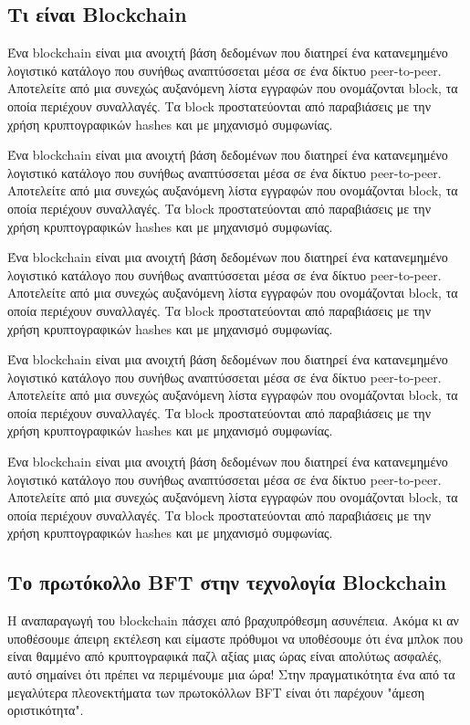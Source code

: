 \subsection{Τι είναι Blockchain}
Ένα blockchain είναι μια ανοιχτή βάση δεδομένων που διατηρεί ένα κατανεμημένο λογιστικό κατάλογο που συνήθως αναπτύσσεται μέσα σε ένα δίκτυο peer-to-peer. Αποτελείτε από μια συνεχώς αυξανόμενη λίστα εγγραφών που ονομάζονται block, τα οποία περιέχουν συναλλαγές. Τα block προστατεύονται από παραβιάσεις με την χρήση κρυπτογραφικών hashes και με μηχανισμό συμφωνίας.

Ένα blockchain είναι μια ανοιχτή βάση δεδομένων που διατηρεί ένα κατανεμημένο λογιστικό κατάλογο που συνήθως αναπτύσσεται μέσα σε ένα δίκτυο peer-to-peer. Αποτελείτε από μια συνεχώς αυξανόμενη λίστα εγγραφών που ονομάζονται block, τα οποία περιέχουν συναλλαγές. Τα block προστατεύονται από παραβιάσεις με την χρήση κρυπτογραφικών hashes και με μηχανισμό συμφωνίας.

Ένα blockchain είναι μια ανοιχτή βάση δεδομένων που διατηρεί ένα κατανεμημένο λογιστικό κατάλογο που συνήθως αναπτύσσεται μέσα σε ένα δίκτυο peer-to-peer. Αποτελείτε από μια συνεχώς αυξανόμενη λίστα εγγραφών που ονομάζονται block, τα οποία περιέχουν συναλλαγές. Τα block προστατεύονται από παραβιάσεις με την χρήση κρυπτογραφικών hashes και με μηχανισμό συμφωνίας.

Ένα blockchain είναι μια ανοιχτή βάση δεδομένων που διατηρεί ένα κατανεμημένο λογιστικό κατάλογο που συνήθως αναπτύσσεται μέσα σε ένα δίκτυο peer-to-peer. Αποτελείτε από μια συνεχώς αυξανόμενη λίστα εγγραφών που ονομάζονται block, τα οποία περιέχουν συναλλαγές. Τα block προστατεύονται από παραβιάσεις με την χρήση κρυπτογραφικών hashes και με μηχανισμό συμφωνίας.

Ένα blockchain είναι μια ανοιχτή βάση δεδομένων που διατηρεί ένα κατανεμημένο λογιστικό κατάλογο που συνήθως αναπτύσσεται μέσα σε ένα δίκτυο peer-to-peer. Αποτελείτε από μια συνεχώς αυξανόμενη λίστα εγγραφών που ονομάζονται block, τα οποία περιέχουν συναλλαγές. Τα block προστατεύονται από παραβιάσεις με την χρήση κρυπτογραφικών hashes και με μηχανισμό συμφωνίας.

\subsection{Το πρωτόκολλο BFT στην τεχνολογία Blockchain}
Η αναπαραγωγή του blockchain πάσχει από βραχυπρόθεσμη ασυνέπεια. Ακόμα κι αν υποθέσουμε άπειρη εκτέλεση και είμαστε πρόθυμοι να υποθέσουμε ότι ένα μπλοκ που είναι θαμμένο από κρυπτογραφικά παζλ αξίας μιας ώρας είναι απολύτως ασφαλές, αυτό σημαίνει ότι πρέπει να περιμένουμε μια ώρα! Στην πραγματικότητα ένα από τα μεγαλύτερα πλεονεκτήματα των πρωτοκόλλων BFT είναι ότι παρέχουν "άμεση οριστικότητα".

